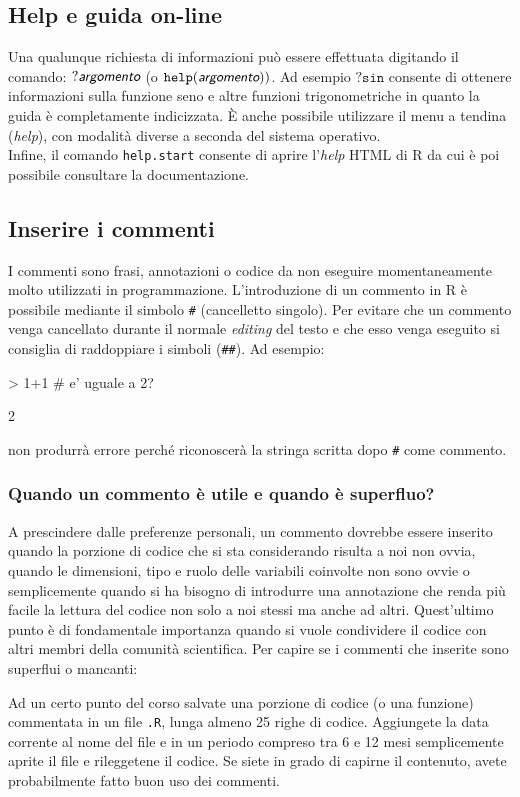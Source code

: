 \documentclass[onecolumn,11pt]{book}
\newcommand{\varia}[1]{\textsl{\textsf{#1}}}
\begin{document}
 \subsection*{Help e guida on-line}
Una qualunque richiesta di informazioni pu\`o essere effettuata digitando il comando:
$?\varia{argomento}$   (o $\texttt{help}(\varia{argomento}))$.
Ad esempio $?\texttt{sin}$  consente di ottenere informazioni sulla funzione seno e altre funzioni trigonometriche in quanto la guida \`e completamente indicizzata. \`E anche possibile utilizzare il menu a tendina ({\it help}), con modalit\`a diverse a seconda del sistema operativo.\\
Infine, il comando \texttt{help.start} consente di aprire l'\textit{help} HTML di \textsf{R} da cui \`e poi possibile consultare la documentazione.



\subsection*{Inserire i commenti}  
I commenti sono frasi, annotazioni o codice da non eseguire momentaneamente molto utilizzati in programmazione. L'introduzione di un commento in \textsf{R} \`e possibile mediante il simbolo \texttt{\#} (cancelletto singolo). Per evitare che un commento venga cancellato durante il normale \textit{editing} del testo e che esso venga eseguito si consiglia di raddoppiare i simboli (\texttt{\#\#}). Ad esempio:
\index{\texttt{\#}} 
\begin{Schunk}
\begin{Sinput}
> 1+1 # e' uguale a 2?
\end{Sinput}
\begin{Soutput}
[1] 2
\end{Soutput}
\end{Schunk}
non produrr\`a errore perch\'e riconoscer\`a la stringa scritta dopo \texttt{\#} come commento.

\subsubsection{Quando un commento \`e utile e quando \`e superfluo?}
A prescindere dalle preferenze personali, un commento dovrebbe essere inserito quando la porzione di codice che si sta considerando risulta a noi non ovvia, quando le dimensioni, tipo e ruolo delle variabili coinvolte non sono ovvie o semplicemente quando si ha bisogno di introdurre una annotazione che renda pi\`u facile la lettura del codice non solo a noi stessi ma anche ad altri. Quest'ultimo punto \`e di fondamentale importanza quando si vuole condividere il codice con altri membri della comunit\`a scientifica. Per capire se i commenti che inserite sono superflui o mancanti:
\begin{shaded}
Ad un certo punto del corso salvate una porzione di codice (o una funzione) commentata in un file \texttt{.R}, lunga almeno 25 righe di codice. Aggiungete la data corrente al nome del file e in un periodo compreso tra 6 e 12 mesi semplicemente aprite il file e rileggetene il codice. Se siete in grado di capirne il contenuto, avete probabilmente fatto buon uso dei commenti.
 \end{shaded} 
\end{document}
